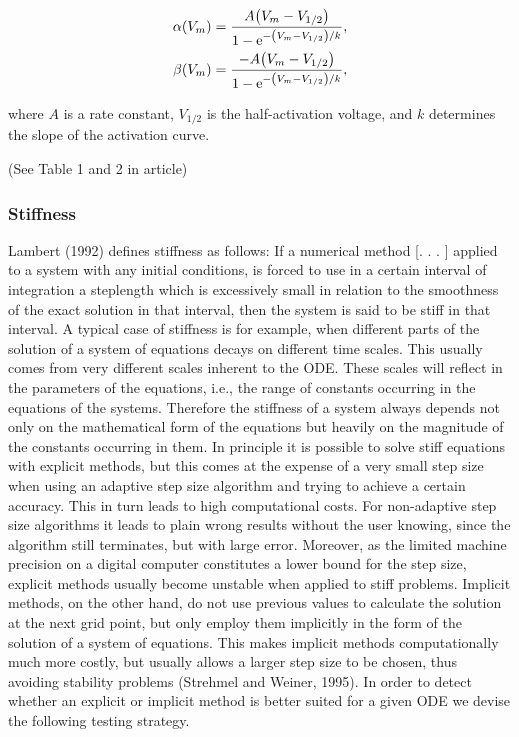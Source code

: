 \begin{align*}
    \alpha \qty(V_m) &= \frac{A \qty(V_m - V_{1/2})}{1 - \mathrm{e}^{- \qty(V_m - V_{1/2})/k}},
    \\
    \beta \qty(V_m) &= \frac{-A \qty(V_m - V_{1/2})}{1 - \mathrm{e}^{- \qty(V_m - V_{1/2})/k}},
\end{align*}

where $A$ is a rate constant, $V_{1/2}$ is the half-activation voltage, and $k$ determines the slope of the activation curve. 

(See Table 1 and 2 in article)







\subsubsection{Stiffness}

Lambert (1992) defines stiffness as follows:
If a numerical method [. . . ] applied to a system
with any initial conditions, is forced to use in a
certain interval of integration a steplength which is
excessively small in relation to the smoothness of the
exact solution in that interval, then the system is said
to be stiff in that interval.
A typical case of stiffness is for example, when different parts of
the solution of a system of equations decays on different time
scales.
This usually comes from very different scales inherent to the
ODE. These scales will reflect in the parameters of the equations,
i.e., the range of constants occurring in the equations of the
systems. Therefore the stiffness of a system always depends not
only on the mathematical form of the equations but heavily on
the magnitude of the constants occurring in them.
In principle it is possible to solve stiff equations with explicit
methods, but this comes at the expense of a very small step size
when using an adaptive step size algorithm and trying to achieve
a certain accuracy. This in turn leads to high computational
costs. For non-adaptive step size algorithms it leads to plain
wrong results without the user knowing, since the algorithm
still terminates, but with large error. Moreover, as the limited
machine precision on a digital computer constitutes a lower
bound for the step size, explicit methods usually become unstable
when applied to stiff problems.
Implicit methods, on the other hand, do not use previous
values to calculate the solution at the next grid point, but only
employ them implicitly in the form of the solution of a system of
equations. This makes implicit methods computationally much
more costly, but usually allows a larger step size to be chosen,
thus avoiding stability problems (Strehmel and Weiner, 1995).
In order to detect whether an explicit or implicit method is
better suited for a given ODE we devise the following testing
strategy.

